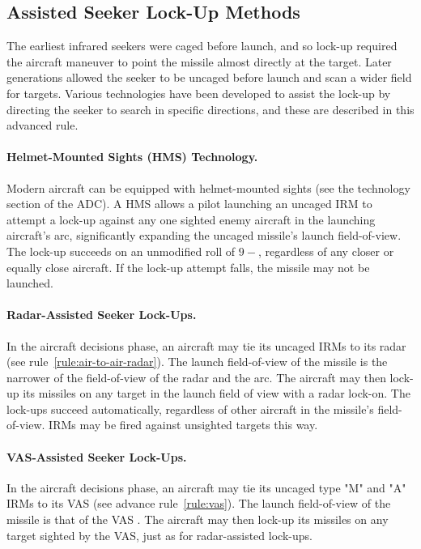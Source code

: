 \begin{advancedrules}
{\section{Assisted Seeker Lock-Up Methods}
\label{rule:irm-seeker-lock-up-assistance-methods}

The earliest infrared seekers were caged before launch, and so lock-up required the aircraft maneuver to point the missile almost directly at the target. Later generations allowed the seeker to be uncaged before launch and scan a wider field for targets. Various technologies have been developed to assist the lock-up by directing the seeker to search in specific directions, and these are described in this advanced rule.

\paragraph{Helmet-Mounted Sights (HMS) Technology.}\label{rule:irm-hms} Modern aircraft can be equipped with helmet-mounted sights (see the technology section of the ADC). A HMS allows a pilot launching an uncaged IRM to attempt a lock-up against any one sighted enemy aircraft in the launching aircraft's  arc, significantly expanding the uncaged missile's launch field-of-view. The lock-up succeeds on an unmodified roll of $9-$, regardless of any closer or equally close aircraft. If the lock-up attempt falls, the missile may not be launched.

\paragraph{Radar-Assisted Seeker Lock-Ups.}\label{rule:irm-radar} In the aircraft decisions phase, an aircraft may tie its uncaged IRMs to its radar (see  rule~\ref{rule:air-to-air-radar}). The launch field-of-view of the missile is the narrower of the field-of-view of the radar and the  arc. The aircraft may then lock-up its missiles on any target in the launch field of view with a radar lock-on. The lock-ups succeed automatically, regardless of other aircraft in the missile's field-of-view. IRMs may be fired against unsighted targets this way.

\paragraph{VAS-Assisted Seeker Lock-Ups.}\label{rule:irm-vas} In the aircraft decisions phase, an aircraft may tie its uncaged type "M" and "A" IRMs to its VAS (see advance rule~\ref{rule:vas}). The launch field-of-view of the missile is that of the VAS . The aircraft may then lock-up its missiles on any target sighted by the VAS, just as for radar-assisted lock-ups.

}
\end{advancedrules}
